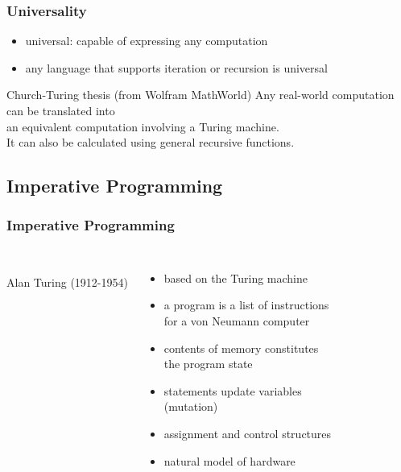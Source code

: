\documentclass[dvipsnames]{beamer}
\theoremstyle{plain}
\begin{document}
\begin{frame}
  \frametitle{Universality}

  \begin{itemize}
    \item \alert{universal}: capable of expressing any computation
    \item any language that supports iteration or recursion is universal
  \end{itemize}

  \pause
  \medskip
  \begin{block}{Church-Turing thesis (from Wolfram MathWorld)}
    Any real-world computation can be translated into\\
    an equivalent computation involving a Turing machine.\\
    \medskip
    It can also be calculated using general recursive functions.
  \end{block}
\end{frame}

\subsection{Imperative Programming}

\begin{frame}
  \frametitle{Imperative Programming}

  \begin{columns}
    \begin{center}
      \\
      Alan Turing (1912-1954)
    \end{center}

    \begin{itemize}
      \item based on the Turing machine
      \item a program is a list of instructions\\
        for a von Neumann computer
      \item contents of memory constitutes\\
        the program \alert{state}

      \pause
      \medskip
      \item statements update variables\\
        (\alert{mutation})
      \item assignment and control structures
      \item natural model of hardware
    \end{itemize}
  \end{columns}
\end{frame}
\end{document}
